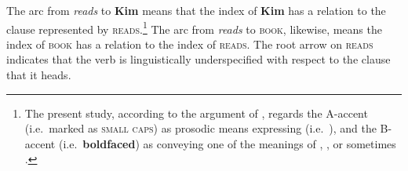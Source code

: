 

\noindent The arc from \textit{reads} to \textbf{Kim} means that the
index of \textbf{Kim} has a  relation to the
clause represented by \textsc{reads}.\footnote{The present
  study, according to the argument of \citet{hedberg:06}, regards the
  A-accent (i.e.\ marked as \textsc{small caps}) as prosodic means
  expressing  (i.e.\ ),
  and  the B-accent (i.e.\ \textbf{boldfaced}) as conveying one of the
  meanings of , , or sometimes
  .} The arc from \textit{reads} to \textsc{book},
likewise, means the index of \textsc{book} has a 
relation to the index of \textsc{reads}. The root arrow on
\textsc{reads} indicates that the verb is linguistically
underspecified with respect to the clause that it heads.



